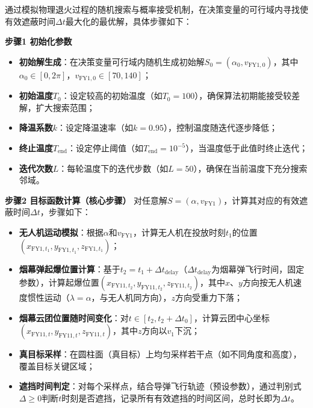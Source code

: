 \documentclass[../main.tex]{subfiles}
\begin{document}

通过模拟物理退火过程的随机搜索与概率接受机制，在决策变量的可行域内寻找使有效遮蔽时间$\Delta t$最大化的最优解，具体步骤如下：

\noindent\textbf{步骤1 初始化参数}
\begin{itemize}
    \item \textbf{初始解生成}：在决策变量可行域内随机生成初始解$S_0=(\alpha_0, v_{\text{FY1},0})$，其中$\alpha_0 \in [0,2\pi]$，$v_{\text{FY1},0} \in [70,140]$；
    \item \textbf{初始温度$T_0$}：设定较高的初始温度（如$T_0=100$），确保算法初期能接受较差解，扩大搜索范围；
    \item \textbf{降温系数$k$}：设定降温速率（如$k=0.95$），控制温度随迭代逐步降低；
    \item \textbf{终止温度$T_{\text{end}}$}：设定停止阈值（如$T_{\text{end}}=10^{-5}$），当温度低于此值时终止迭代；
    \item \textbf{迭代次数$L$}：每轮温度下的迭代步数（如$L=50$），确保在当前温度下充分搜索邻域。
\end{itemize}

\noindent\textbf{步骤2 目标函数计算（核心步骤）}
对任意解$S=(\alpha, v_{\text{FY1}})$，计算其对应的有效遮蔽时间$\Delta t$，步骤如下：
\begin{itemize}
    \item \textbf{无人机运动模拟}：根据$\alpha$和$v_{\text{FY1}}$，计算无人机在投放时刻$t_1$的位置$(x_{\text{FY1},t_1}, y_{\text{FY1},t_1}, z_{\text{FY1},t_1})$；
    \item \textbf{烟幕弹起爆位置计算}：基于$t_2 = t_1 + \Delta t_{\text{delay}}$（$\Delta t_{\text{delay}}$为烟幕弹飞行时间，固定参数），计算起爆位置$(x_{\text{FY11},t_2}, y_{\text{FY11},t_2}, z_{\text{FY11},t_2})$，其中$x$、$y$方向按无人机速度惯性运动（$\lambda=\alpha$，与无人机同方向），$z$方向受重力下落；
    \item \textbf{烟幕云团位置随时间变化}：对$t \in [t_2, t_2+\Delta t_0]$，计算云团中心坐标$(x_{\text{FY11},t}, y_{\text{FY11},t}, z_{\text{FY11},t})$，其中$z$方向以$v_1$下沉；
    \item \textbf{真目标采样}：在圆柱面（真目标）上均匀采样若干点（如不同角度和高度），覆盖目标关键区域；
    \item \textbf{遮挡时间判定}：对每个采样点，结合导弹飞行轨迹（预设参数），通过判别式$\Delta \geq 0$判断$t$时刻是否遮挡，记录所有有效遮挡的时间区间，总时长即为$\Delta t$。
\end{itemize}
\end{document}
